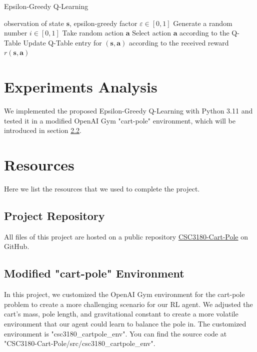 \documentclass[10pt,a4paper]{article}
\begin{document}
\begin{algorithm}
\caption{Epsilon-Greedy Q-Learning}\label{alg:egql}
\begin{algorithmic}
\Require observation of state $\boldsymbol{s}$, epsilon-greedy factor $\varepsilon \in [0,1]$
\State Generate a random number $i \in [0,1]$
\State Take random action $\boldsymbol{a}$
\Else
\State Select action $\boldsymbol{a}$ according to the Q-Table 
\EndIf
\State Update Q-Table entry for $(\boldsymbol{s}, \boldsymbol{a})$ according to the received reward $r(\boldsymbol{s}, \boldsymbol{a})$ 
\EndWhile
\end{algorithmic}
\end{algorithm}

\section{Experiments Analysis}
We implemented the proposed Epsilon-Greedy Q-Learning with Python 3.11 and tested it in a modified OpenAI Gym "cart-pole" environment, which will be introduced in section \ref{5.2}. 



\section{Resources}
Here we list  the resources that we used to complete the project. 

\subsection{Project Repository}
All files of this project are hosted on a public repository \href{https://github.com/zixingjiang/CSC3180-Cart-Pole}{CSC3180-Cart-Pole} on GitHub. 


\subsection{Modified "cart-pole" Environment}\label{5.2}
In this project, we customized the OpenAI Gym environment for the cart-pole problem to create a more challenging scenario for our RL agent. We adjusted the cart's mass, pole length, and gravitational constant to create a more volatile environment that our agent could learn to balance the pole in. The customized environment is "csc3180\_cartpole\_env". You can find the source code at "CSC3180-Cart-Pole/src/csc3180\_cartpole\_env".
\end{document}
